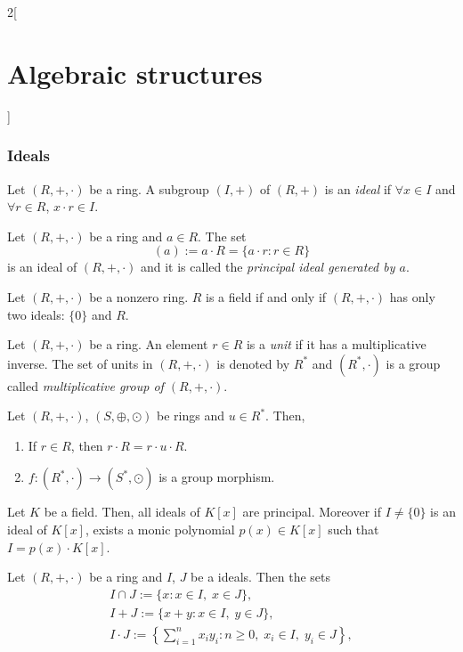 \documentclass[../../../main.tex]{subfiles}
\begin{document}
\begin{multicols}{2}[\section{Algebraic structures}]
\subsubsection{Ideals}
\begin{definition}[Ideal]
    Let $(R,+,\cdot)$ be a ring. A subgroup $(I,+)$ of $(R,+)$ is an \textit{ideal} if $\forall x\in I$ and $\forall r\in R$, $x\cdot r\in I$.
\end{definition}
\begin{lemma}
    Let $(R,+,\cdot)$ be a ring and $a\in R$. The set $$(a):=a\cdot R=\{a\cdot r:r\in R\}$$ is an ideal of $(R,+,\cdot)$ and it is called the \textit{principal ideal generated by $a$}.
\end{lemma}
\begin{prop}
    Let $(R,+,\cdot)$ be a nonzero ring. $R$ is a field if and only if $(R,+,\cdot)$ has only two ideals: $\{0\}$ and $R$.
\end{prop}
\begin{definition}
    Let $(R,+,\cdot)$ be a ring. An element $r\in R$ is a \textit{unit} if it has a multiplicative inverse. The set of units in $(R,+,\cdot)$ is denoted by $R^*$ and $(R^*,\cdot)$ is a group called \textit{multiplicative group of $(R,+,\cdot)$}.
\end{definition}
\begin{lemma}
    Let $(R,+,\cdot)$, $(S,\oplus,\odot)$ be rings and $u\in R^*$. Then,
    \begin{enumerate}
        \item If $r\in R$, then $r\cdot R=r\cdot u\cdot R$.
        \item $f:(R^*,\cdot)\rightarrow (S^*,\odot)$ is a group morphism.
    \end{enumerate}
\end{lemma}
\begin{prop}
    Let $K$ be a field. Then, all ideals of $K[x]$ are principal. Moreover if $I\ne\{0\}$ is an ideal of $K[x]$, exists a monic polynomial $p(x)\in K[x]$ such that $I=p(x)\cdot K[x]$.
\end{prop}
\begin{prop}
    Let $(R,+,\cdot)$ be a ring and $I$, $J$ be a ideals. Then the sets
    \begin{gather*}
        I\cap J:=\{x:x\in I,\;x\in J\},\\
        I+J:=\{x+y:x\in I,\;y\in J\},\\
        I\cdot J:=\left\{\sum_{i=1}^nx_iy_i:n\geq 0,\;x_i\in I,\;y_i\in J\right\},
    \end{gather*}

\end{prop}
\end{multicols}
\end{document}
